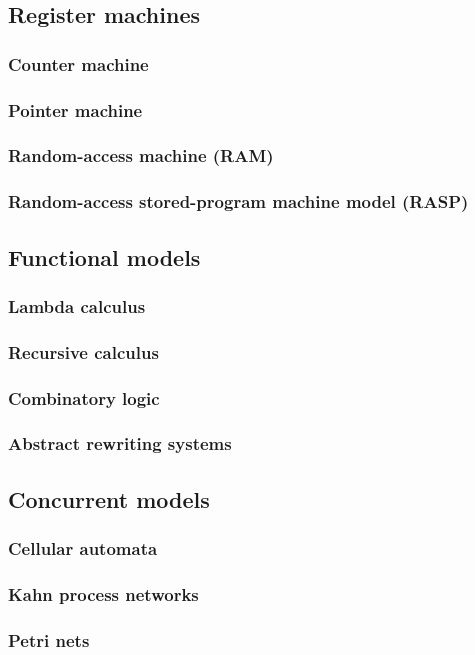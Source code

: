 \subsection{Register machines}
\subsubsection{Counter machine}
\subsubsection{Pointer machine}
\subsubsection{Random-access machine (RAM)}
\subsubsection{Random-access stored-program machine model (RASP)}
\subsection{Functional models}
\subsubsection{Lambda calculus}
\subsubsection{Recursive calculus}
\subsubsection{Combinatory logic}
\subsubsection{Abstract rewriting systems}
\subsection{Concurrent models}
\subsubsection{Cellular automata}
\subsubsection{Kahn process networks}
\subsubsection{Petri nets}
